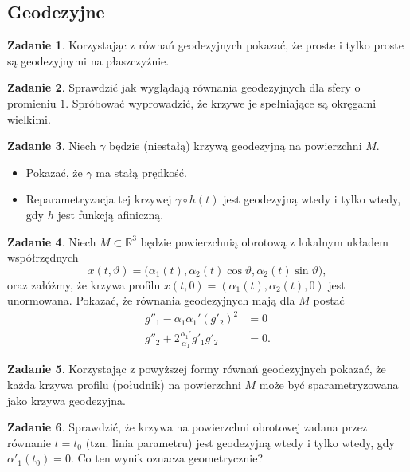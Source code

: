 \documentclass[a4paper,11pt]{article}
\theoremstyle{definition}\newtheorem{exercise}{Zadanie}
\theoremstyle{definition}\newtheorem{remark}{Uwaga}
\begin{document}
\subsection{Geodezyjne}

\begin{exercise}
 Korzystając z r\'ownań geodezyjnych pokazać, że proste i tylko proste są 
geodezyjnymi na płaszczyźnie.
\end{exercise}

\begin{exercise}
 Sprawdzić jak wyglądają r\'ownania geodezyjnych dla sfery o promieniu $1$. 
Spr\'obować wyprowadzić, że krzywe je spełniające są okręgami wielkimi.
\end{exercise}



\begin{exercise}
Niech $\gamma$ będzie (niestałą) krzywą geodezyjną na powierzchni $M$. 
\begin{itemize}
 \item Pokazać, że $\gamma$ ma stałą prędkość.
 \item Reparametryzacja tej krzywej $\gamma\circ h (t)$ jest geodezyjną wtedy i 
tylko wtedy, gdy $h$ jest funkcją afiniczną. 
\end{itemize}

\end{exercise}

\begin{exercise}
Niech $M\subset \mathbb{R}^3$ będzie powierzchnią obrotową z lokalnym układem 
współrzędnych 
\[x(t,\vartheta)=\big(\alpha_1(t),\alpha_2(t)\cos \vartheta ,
\alpha_2(t)\sin\vartheta \big),\]
oraz załóżmy, że krzywa profilu $x(t,0)=(\alpha_1(t),\alpha_2(t),0)$ jest 
unormowana. Pokazać, że r\'ownania geodezyjnych mają dla $M$ postać
\begin{align*}
g''_1-\alpha_1\alpha_1'(g'_2)^2&=0\\
g''_2+2\frac{\alpha_1'}{\alpha_1}g'_1g'_2&=0.
\end{align*}
\end{exercise}

\begin{exercise}
Korzystając z powyższej formy r\'ownań geodezyjnych pokazać, że każda krzywa 
profilu (południk) na powierzchni $M$ może być sparametryzowana jako krzywa 
geodezyjna.
\end{exercise}

\begin{exercise}
Sprawdzić, że krzywa na powierzchni obrotowej zadana przez r\'ownanie 
$t=t_0$ (tzn. linia parametru) jest geodezyjną wtedy i tylko wtedy, gdy 
$\alpha'_1(t_0)=0$. Co ten wynik oznacza geometrycznie?

\end{exercise}
\end{document}
